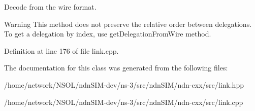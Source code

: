 Decode from the wire format. 

\begin{DoxyWarning}{Warning}
This method does not preserve the relative order between delegations. To get a delegation by index, use {\ttfamily get\+Delegation\+From\+Wire} method. 
\end{DoxyWarning}


Definition at line 176 of file link.\+cpp.



The documentation for this class was generated from the following files\+:\begin{DoxyCompactItemize}
\item 
/home/network/\+N\+S\+O\+L/ndn\+S\+I\+M-\/dev/ns-\/3/src/ndn\+S\+I\+M/ndn-\/cxx/src/link.\+hpp\item 
/home/network/\+N\+S\+O\+L/ndn\+S\+I\+M-\/dev/ns-\/3/src/ndn\+S\+I\+M/ndn-\/cxx/src/link.\+cpp\end{DoxyCompactItemize}
